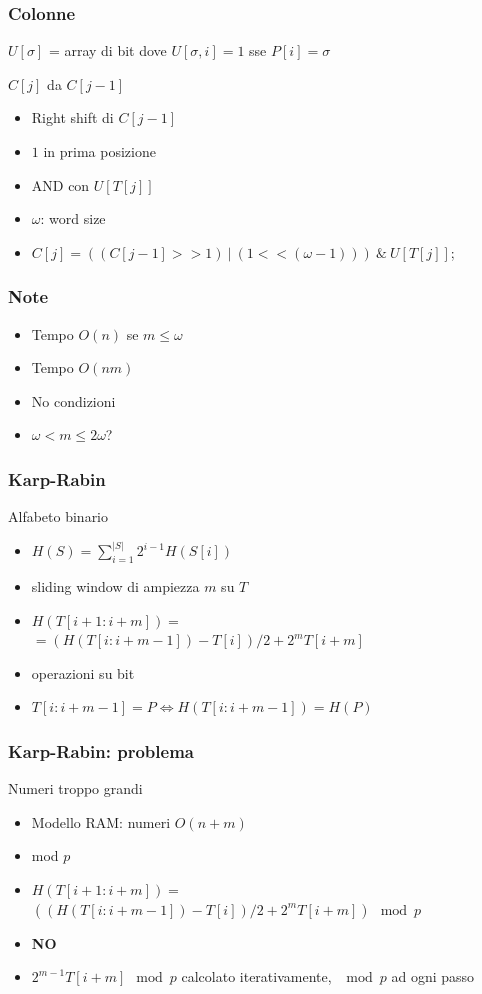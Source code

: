 \begin{frame}[fragile]
\frametitle{Colonne}
$U[\sigma]$ = array di bit dove $U[\sigma,i]=1$ sse $P[i]=\sigma$

\begin{block}{$C[j]$ da $C[j-1]$}
\begin{itemize}
\item
Right shift di $C[j-1]$
\item
$1$ in prima posizione
\item
AND con $U[T[j]]$
\item
\alert{$\omega$}: word size
\item
$C[j] = \left( \left(C[j-1] >> 1 \right) \  | \  \left(1 << (\omega -1) \right) \right)\ \&\  U[T[j]]$;
\end{itemize}
\end{block}
\end{frame}

\begin{frame}[fragile]
\frametitle{Note}
\begin{itemize}
\item
Tempo $O(n)$ se $m\le \omega$
\item
Tempo $O(nm)$
\item
No condizioni
\item
$\omega < m\le 2\omega$?
\end{itemize}
\end{frame}

\begin{frame}[fragile]
\frametitle{Karp-Rabin}
\begin{block}{Alfabeto binario}
\begin{itemize}
\item
$H(S)=\sum_{i=1}^{|S|} 2^{i-1}H(S[i])$
\item
sliding window di ampiezza $m$ su $T$
\item
$H(T[i+1:i+m]) =$\\
$=\left(H(T[i:i+m-1]) - T[i] \right) / 2 + 2^{m}T[i+m]$
\item
operazioni su bit
\item
$T[i:i+m-1]=P \Leftrightarrow H(T[i:i+m-1])=H(P)$
\end{itemize}
\end{block}
\end{frame}

\begin{frame}[fragile]
\frametitle{Karp-Rabin: problema}
\begin{block}{Numeri troppo grandi}
\begin{itemize}
\item
Modello RAM: numeri $O(n+m)$
\item
mod $p$
\item
$H(T[i+1:i+m]) =$\\
$\left(\left(H(T[i:i+m-1]) - T[i] \right) / 2 + 2^{m}T[i+m] \right)\mod p$
\item \textbf{NO}
\item
$2^{m-1}T[i+m] \mod p$ calcolato iterativamente, $\mod p$ ad ogni passo
\end{itemize}
\end{block}
\end{frame}

